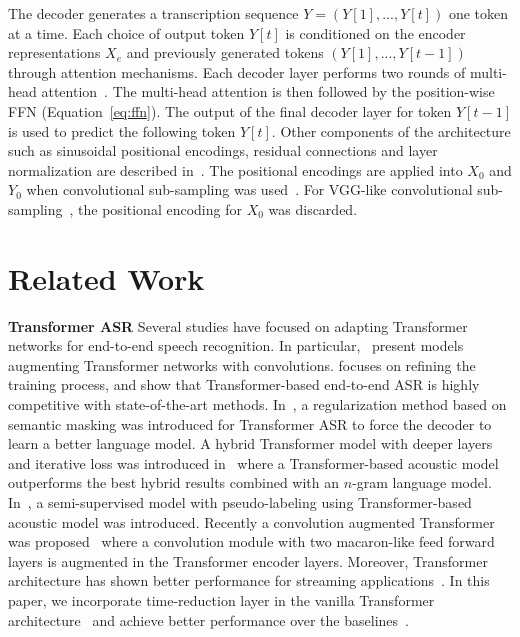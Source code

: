 \documentclass{article}
\begin{document}
The decoder generates a transcription sequence $Y=(Y[1],...,Y[t])$ one token at a time. Each choice of output token $Y[t]$ is conditioned on the encoder representations $X_e$ and previously generated tokens $(Y[1],...,Y[t-1])$ through attention mechanisms. Each decoder layer performs two rounds of multi-head attention~\citep{karita2019asru}.
The multi-head attention is then followed by the position-wise FFN (Equation~\ref{eq:ffn}).  The output of the final decoder layer for token $Y[t-1]$ is used to predict the following token $Y[t]$. Other components of the architecture such as sinusoidal positional encodings, residual connections and layer normalization are described in~\citep{vaswani2017attention}. The positional encodings are applied into $X_0$ and $Y_0$ when convolutional sub-sampling was used~\citep{karita2019asru,espnet}. For VGG-like convolutional sub-sampling~\citep{wang2020a}, the positional encoding for $X_0$ was discarded.

\section{Related Work}
\label{sec:prior}

\textbf{Transformer ASR}
Several studies have focused on adapting Transformer networks for end-to-end speech recognition. In particular,~\citep{dong2018speech,mohamed2019transformers} present models augmenting Transformer networks with convolutions. \citep{karita2019asru} focuses on refining the training process, and show that Transformer-based end-to-end ASR is highly competitive with state-of-the-art methods. In~\citep{wang2020a}, a regularization method based on semantic masking was introduced for Transformer  ASR to force the decoder to learn a better language model. A hybrid Transformer model with deeper layers  and iterative loss was introduced in~\citep{wang2020b} where a Transformer-based acoustic model outperforms the best hybrid results  combined with an $n$-gram language model. In~\citep{e2e2020}, a semi-supervised model with pseudo-labeling using Transformer-based acoustic model was introduced. Recently a convolution augmented Transformer was proposed~\citep{conformer} where a convolution module with two macaron-like feed forward layers is augmented in the Transformer encoder layers. Moreover, Transformer architecture has shown better performance for streaming applications~\citep{transducer,moritz2020,sony}. In this paper, we incorporate  time-reduction layer in the vanilla Transformer architecture~\citep{vaswani2017attention, karita2019asru} and achieve better performance over the baselines~\citep{karita2019asru,wang2020a,wang2020b,moritz2020,e2e2020,specaugment}.       
\end{document}
